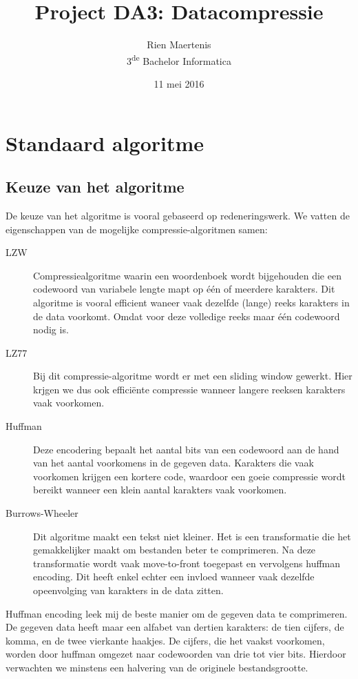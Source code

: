 \documentclass[a4paper]{article}
\author{Rien Maertenis\\3\textsuperscript{de} Bachelor Informatica}
\title{Project DA3: Datacompressie}
\date{11 mei 2016}
\begin{document}
\maketitle

\section{Standaard algoritme}

\subsection{Keuze van het algoritme}

De keuze van het algoritme is vooral gebaseerd op redeneringswerk. We vatten de eigenschappen van de mogelijke compressie-algoritmen samen:
\begin{description}
    \item [LZW] Compressiealgoritme waarin een woordenboek wordt bijgehouden die een codewoord van variabele lengte mapt op één of meerdere karakters. Dit algoritme is vooral efficient waneer vaak dezelfde (lange) reeks karakters in de data voorkomt. Omdat voor deze volledige reeks maar één codewoord nodig is.
    \item [LZ77] Bij dit compressie-algoritme wordt er met een sliding window gewerkt. Hier krjgen we dus ook efficiënte compressie wanneer langere reeksen karakters vaak voorkomen.
    \item [Huffman] Deze encodering bepaalt het aantal bits van een codewoord aan de hand van het aantal voorkomens in de gegeven data. Karakters die vaak voorkomen krijgen een kortere code, waardoor een goeie compressie wordt bereikt wanneer een klein aantal karakters vaak voorkomen.
    \item [Burrows-Wheeler] Dit algoritme maakt een tekst niet kleiner. Het is een transformatie die het gemakkelijker maakt om bestanden beter te comprimeren. Na deze transformatie wordt vaak move-to-front toegepast en vervolgens huffman encoding. Dit heeft enkel echter een invloed wanneer vaak dezelfde opeenvolging van karakters in de data zitten.
\end{description}

Huffman encoding leek mij de beste manier om de gegeven data te comprimeren. De gegeven data heeft maar een alfabet van dertien karakters: de tien cijfers, de komma, en de twee vierkante haakjes. De cijfers, die het vaakst voorkomen, worden door huffman omgezet naar codewoorden van drie tot vier bits. Hierdoor verwachten we minstens een halvering van de originele bestandsgrootte.
\end{document}
